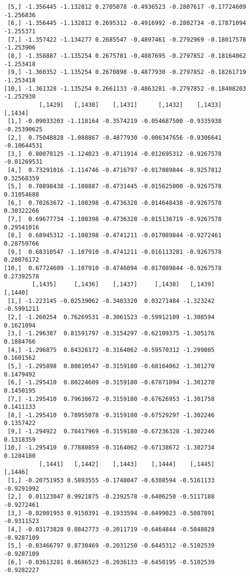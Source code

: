 \documentclass[
  letterpaper,
  DIV=11,
  numbers=noendperiod]{scrreprt}
\begin{document}
\begin{verbatim}
 [5,] -1.356445 -1.132812 0.2705078 -0.4936523 -0.2807617 -0.17724609 -1.256836
 [6,] -1.356445 -1.132812 0.2695312 -0.4916992 -0.2802734 -0.17871094 -1.255371
 [7,] -1.357422 -1.134277 0.2685547 -0.4897461 -0.2792969 -0.18017578 -1.253906
 [8,] -1.358887 -1.135254 0.2675781 -0.4887695 -0.2797852 -0.18164062 -1.253418
 [9,] -1.360352 -1.135254 0.2670898 -0.4877930 -0.2797852 -0.18261719 -1.253418
[10,] -1.361328 -1.135254 0.2661133 -0.4863281 -0.2797852 -0.18408203 -1.252930
          [,1429]   [,1430]    [,1431]      [,1432]    [,1433]     [,1434]
 [1,] -0.09033203 -1.118164 -0.3574219 -0.054687500 -0.9335938 -0.25390625
 [2,]  0.75048828 -1.088867 -0.4877930 -0.006347656 -0.9306641 -0.10644531
 [3,]  0.80078125 -1.124023 -0.4711914 -0.012695312 -0.9267578 -0.01269531
 [4,]  0.73291016 -1.114746 -0.4716797 -0.017089844 -0.9257812  0.32568359
 [5,]  0.70898438 -1.108887 -0.4731445 -0.015625000 -0.9267578  0.31054688
 [6,]  0.70263672 -1.108398 -0.4736328 -0.014648438 -0.9267578  0.30322266
 [7,]  0.69677734 -1.108398 -0.4736328 -0.015136719 -0.9267578  0.29541016
 [8,]  0.68945312 -1.108398 -0.4741211 -0.017089844 -0.9272461  0.28759766
 [9,]  0.68310547 -1.107910 -0.4741211 -0.016113281 -0.9267578  0.28076172
[10,]  0.67724609 -1.107910 -0.4746094 -0.017089844 -0.9267578  0.27392578
        [,1435]     [,1436]    [,1437]     [,1438]   [,1439]    [,1440]
 [1,] -1.223145 -0.02539062 -0.3403320  0.03271484 -1.323242 -0.5991211
 [2,] -1.260254  0.76269531 -0.3061523 -0.59912109 -1.308594  0.1621094
 [3,] -1.296387  0.81591797 -0.3154297 -0.62109375 -1.305176  0.1884766
 [4,] -1.296875  0.84326172 -0.3164062 -0.59570312 -1.299805  0.1601562
 [5,] -1.295898  0.80810547 -0.3159180 -0.68164062 -1.301270  0.1479492
 [6,] -1.295410  0.80224609 -0.3159180 -0.67871094 -1.301270  0.1450195
 [7,] -1.295410  0.79638672 -0.3159180 -0.67626953 -1.301758  0.1411133
 [8,] -1.295410  0.78955078 -0.3159180 -0.67529297 -1.302246  0.1357422
 [9,] -1.294922  0.78417969 -0.3159180 -0.67236328 -1.302246  0.1318359
[10,] -1.295410  0.77880859 -0.3164062 -0.67138672 -1.302734  0.1284180
          [,1441]   [,1442]    [,1443]    [,1444]    [,1445]    [,1446]
 [1,] -0.20751953 0.5893555 -0.1748047 -0.6308594 -0.5161133 -0.9291992
 [2,]  0.01123047 0.9921875 -0.2392578 -0.6406250 -0.5117188 -0.9272461
 [3,] -0.02001953 0.9150391 -0.1933594 -0.6499023 -0.5087891 -0.9311523
 [4,] -0.03173828 0.8842773 -0.2011719 -0.6464844 -0.5048828 -0.9287109
 [5,] -0.03466797 0.8730469 -0.2031250 -0.6445312 -0.5102539 -0.9287109
 [6,] -0.03613281 0.8686523 -0.2036133 -0.6450195 -0.5102539 -0.9282227

\end{verbatim}
\end{document}
